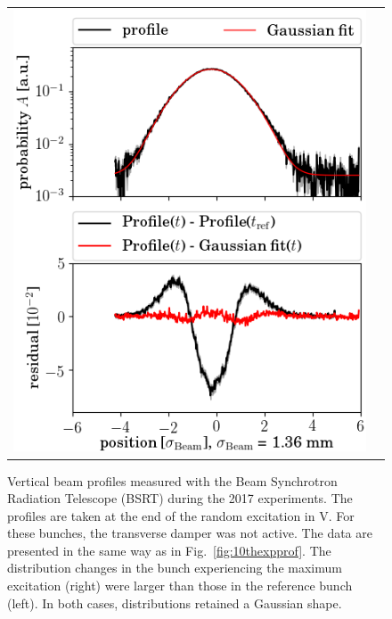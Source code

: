 \documentclass[aps
,prstab
,reprint
,longbibliography
,preprintnumbers
,showkeys
,amsfonts,amssymb,amsmath
,floatfix
]{revtex4-1}
\newlength{\bsrtwidth}
\begin{document}
\begin{figure}
\begin{tabular}{cc}
    \includegraphics[width=\bsrtwidth]{profile_v_ranv_slot_1532.png} \\
  \end{tabular}
  \caption{Vertical beam profiles measured with the Beam Synchrotron
    Radiation Telescope (BSRT) during the 2017 experiments. The
    profiles are taken at the end of the random excitation in V. For
    these bunches, the transverse damper was not active. The data are
    presented in the same way as in Fig.~\ref{fig:10thexpprof}. The
    distribution changes in the bunch experiencing the maximum
    excitation (right) were larger than those in the reference bunch
    (left). In both cases, distributions retained a Gaussian shape.}
  \label{fig:ranexpprof}
\end{figure}
\end{document}
